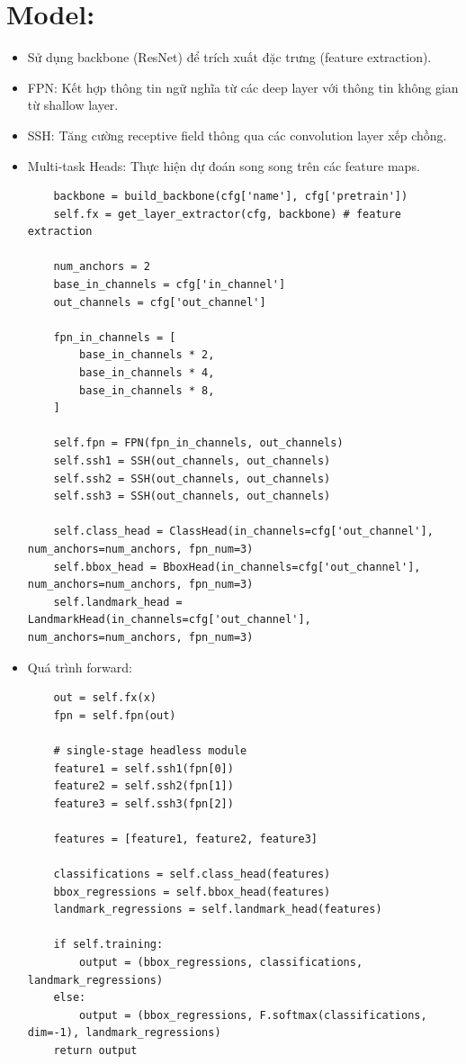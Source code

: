 \documentclass[12pt, a4paper, oneside]{book}
\theoremstyle{plain}
\numberwithin{equation}{chapter} \DeclareMathOperator{\Var}{var}
\begin{document}
\section{Model:}
\begin{itemize}
    \item[--] Sử dụng backbone (ResNet) để trích xuất đặc trưng (feature extraction).
    \item[--] FPN: Kết hợp thông tin ngữ nghĩa từ các deep layer với thông tin không gian từ shallow layer.
    \item[--] SSH: Tăng cường receptive field thông qua các convolution layer xếp chồng.
    \item[--] Multi-task Heads: Thực hiện dự đoán song song trên các feature maps.  
\begin{lstlisting}
    backbone = build_backbone(cfg['name'], cfg['pretrain'])
    self.fx = get_layer_extractor(cfg, backbone) # feature extraction

    num_anchors = 2
    base_in_channels = cfg['in_channel']
    out_channels = cfg['out_channel']

    fpn_in_channels = [
        base_in_channels * 2,
        base_in_channels * 4,
        base_in_channels * 8,
    ]

    self.fpn = FPN(fpn_in_channels, out_channels)
    self.ssh1 = SSH(out_channels, out_channels)
    self.ssh2 = SSH(out_channels, out_channels)
    self.ssh3 = SSH(out_channels, out_channels)

    self.class_head = ClassHead(in_channels=cfg['out_channel'], num_anchors=num_anchors, fpn_num=3)
    self.bbox_head = BboxHead(in_channels=cfg['out_channel'], num_anchors=num_anchors, fpn_num=3)
    self.landmark_head = LandmarkHead(in_channels=cfg['out_channel'], num_anchors=num_anchors, fpn_num=3)
\end{lstlisting}
\newpage
    \item[--] Quá trình forward:
\begin{lstlisting}
    out = self.fx(x)
    fpn = self.fpn(out)

    # single-stage headless module
    feature1 = self.ssh1(fpn[0])
    feature2 = self.ssh2(fpn[1])
    feature3 = self.ssh3(fpn[2])

    features = [feature1, feature2, feature3]

    classifications = self.class_head(features)
    bbox_regressions = self.bbox_head(features)
    landmark_regressions = self.landmark_head(features)

    if self.training:
        output = (bbox_regressions, classifications, landmark_regressions)
    else:
        output = (bbox_regressions, F.softmax(classifications, dim=-1), landmark_regressions)
    return output
\end{lstlisting}
\end{itemize}
\end{document}
